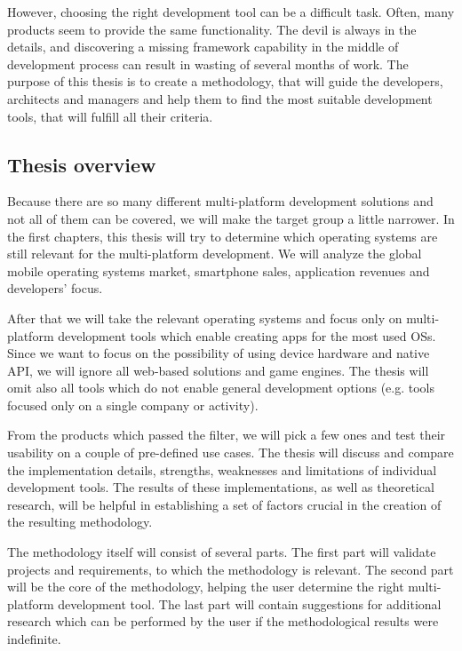 \documentclass[english,master,public,dept460,male,cpdeclaration,oneside]{diploma}
\begin{document}
However, choosing the right development tool can be a difficult task. Often, many products seem to provide the same functionality. The devil is always in the details, and discovering a missing framework capability in the middle of development process can result in wasting of several months of work. The purpose of this thesis is to create a methodology, that will guide the developers, architects and managers and help them to find the most suitable development tools, that will fulfill all their criteria.

\subsection{Thesis overview}
Because there are so many different multi-platform development solutions and not all of them can be covered, we will make the target group a little narrower. In the first chapters, this thesis will try to determine which operating systems are still relevant for the multi-platform development. We will analyze the global mobile operating systems market, smartphone sales, application revenues and developers’ focus. 

After that we will take the relevant operating systems and focus only on multi-platform development tools which enable creating apps for the most used OSs. Since we want to focus on the possibility of using device hardware and native API, we will ignore all web-based solutions and game engines. The thesis will omit also all tools which do not enable general development options (e.g. tools focused only on a single company or activity).

From the products which passed the filter, we will pick a few ones and test their usability on a couple of pre-defined use cases. The thesis will discuss and compare the implementation details, strengths, weaknesses and limitations of individual development tools. The results of these implementations, as well as theoretical research, will be helpful in establishing a set of factors crucial in the creation of the resulting methodology.

The methodology itself will consist of several parts. The first part will validate projects and requirements, to which the methodology is relevant. The second part will be the core of the methodology, helping the user determine the right multi-platform development tool. The last part will contain suggestions for additional research which can be performed by the user if the methodological results were indefinite.
\end{document}

